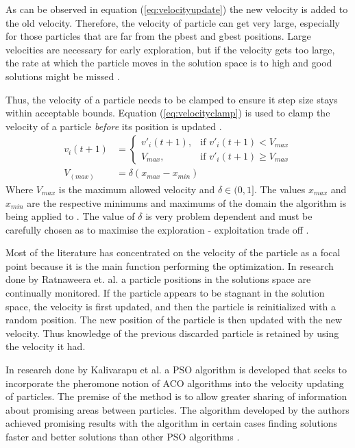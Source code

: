 As can be observed in equation (\ref{eq:velocityupdate}) the new velocity is added to the old velocity. Therefore, the velocity of particle can get very large, especially for those particles that are far from the pbest and gbest positions. Large velocities are necessary for early exploration, but if the velocity gets too large, the rate at which the particle moves in the solution space is to high and good solutions might be missed \cite{FundamentalSwarm}.

Thus, the velocity of a particle needs to be clamped to ensure it step size stays within acceptable bounds. Equation (\ref{eq:velocityclamp}) is used to clamp the velocity of a particle \emph{before} its position is updated \cite{FundamentalSwarm}.
\begin{align}
	v_i(t+1) &=
	\begin{cases}
	v'_i(t+1), &\text{if $v'_i(t+1) < V_{max}$}\\
	V_{max}, &\text{if $v'_i(t+1) \geq V_{max}$}
	\end{cases} \label{eq:velocityclamp}\\
	V_(max) &= \delta(x_{max} - x_{min})
\end{align}
Where $V_{max}$ is the maximum allowed velocity and $\delta \in (0,1]$. The values $x_{max}$ and $x_{min}$ are the respective minimums and maximums of the domain the algorithm is being applied to \cite{FundamentalSwarm}. The value of $\delta$ is very problem dependent and must be carefully chosen as to maximise the exploration - exploitation trade off \cite{FundamentalSwarm}. 

Most of the literature has concentrated on the velocity of the particle as a focal point because it is the main function performing the optimization. In research done by Ratnaweera et. al.\cite{PSOSelfHierarch} a particle positions in the solutions space are continually monitored. If the particle appears to be stagnant in the solution space, the velocity is first updated, and then the particle is reinitialized with a random position. The new position of the particle is then updated with the new velocity. Thus knowledge of the previous discarded particle is retained by using the velocity it had\cite{PSOSelfHierarch}.

In research done by Kalivarapu et al. \cite{PSOPheromones} a PSO algorithm is developed that seeks to incorporate the pheromone notion of ACO algorithms into the velocity updating of particles. The premise of the method is to allow greater sharing of information about promising areas between particles. The algorithm developed by the authors achieved promising results with the algorithm in certain cases finding solutions faster and better solutions than other PSO algorithms \cite{PSOPheromones}. 

